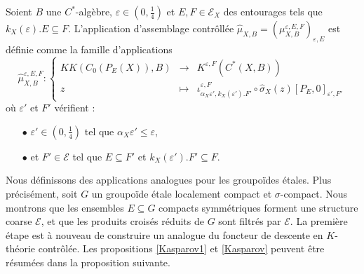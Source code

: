 \begin{definition}
Soient $B$ une $C^*$-algèbre, $\varepsilon\in (0,\frac{1}{4})$ et $E,F\in\mathcal E_X$ des entourages tels que $k_X(\varepsilon).E\subseteq F$. L'application d'assemblage contrôllée $\hat\mu_{X,B}=(\mu_{X,B}^{\varepsilon,E,F})_{\varepsilon,E}$ est définie comme la famille d'applications
\[\hat\mu_{X,B}^{\varepsilon, E,F} :\left\{\begin{array}{rcl} KK(C_0(P_E(X)),B) & \rightarrow & K^{\varepsilon, F}(C^*(X,B)) \\
					z & \mapsto & \iota_{\alpha_X \varepsilon',k_X(\varepsilon').F'}^{\varepsilon,F}\circ\hat\sigma_X(z)[P_{E},0]_{\varepsilon', F'}\end{array}\right.\]
où $\varepsilon'$ et $F'$ vérifient :
\begin{itemize}
\item[$\bullet$] $\varepsilon'\in (0,\frac{1}{4})$ tel que $\alpha_X \varepsilon'\leq \varepsilon$,
\item[$\bullet$] et $F'\in\mathcal E$ tel que $E\subseteq F'$ et $k_X(\varepsilon').F'\subseteq F$.
\end{itemize}
\end{definition}

Nous définissons des applications analogues pour les groupoïdes étales. Plus précisément, soit $G$ un groupoïde étale localement compact et $\sigma$-compact. Nous montrons que les ensembles $E\subseteq G$ compacts symmétriques forment une structure coarse $\mathcal E$, et que les produits croisés réduits de $G$ sont filtrés par $\mathcal E$. La première étape est à nouveau de construire un analogue du foncteur de descente en $K$-théorie contrôlée. Les propositions \ref{Kasparov1} et \ref{Kasparov} peuvent être résumées dans la proposition suivante. 

